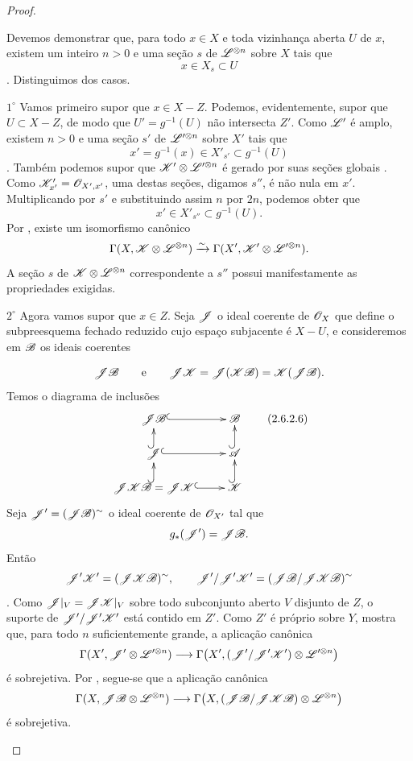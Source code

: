 \begin{proof}
\begin{env}[2.6.2.5]
Devemos demonstrar que, para todo $x\in X$ e toda vizinhança aberta $U$
de $x$, existem um inteiro $n>0$ e uma seção $s$ de
$\mathscr{L}^{\otimes n}$ sobre $X$ tais que
\[
  x\in X_s\subset U
\]
.
Distinguimos dos casos.

\smallskip
\noindent
$1^\circ$ Vamos primeiro supor que $x\in X-Z$.
Podemos, evidentemente, supor que $U\subset X-Z$, de modo que
$U'=g^{-1}(U)$ não intersecta $Z'$.
Como $\mathscr{L}'$ é amplo, existem $n>0$ e uma seção $s'$ de
$\mathscr{L}'^{\otimes n}$ sobre $X'$ tais que
\[
  x'=g^{-1}(x)\in X'_{s'}\subset g^{-1}(U)
\]
.
Também podemos supor que
$\mathscr{K}'\otimes\mathscr{L}'^{\otimes n}$ é gerado por suas seções globais
.
Como $\mathscr{K}'_{x'}=\mathscr{O}_{X',x'}$, uma destas seções, digamos $s''$, é
não nula em $x'$.
Multiplicando por $s'$ e substituindo assim $n$ por $2n$, podemos obter
que
\[
  x'\in X'_{s''}\subset g^{-1}(U).
\]
Por , existe um isomorfismo canônico
\[
  \Gamma(X,\mathscr{K}\otimes\mathscr{L}^{\otimes n})
  \xrightarrow{\sim}
  \Gamma(X',\mathscr{K}'\otimes\mathscr{L}'^{\otimes n}).
\]
A seção $s$ de $\mathscr{K}\otimes\mathscr{L}^{\otimes n}$ correspondente a
$s''$ possui manifestamente as propriedades exigidas.

\smallskip
\noindent
$2^\circ$ Agora vamos supor que $x\in Z$.
Seja $\mathscr{J}$ o ideal coerente de $\mathscr{O}_X$ que define o
subpreesquema fechado reduzido cujo espaço subjacente é $X-U$, e consideremos em
$\mathscr{B}$ os ideais coerentes


\[
  \mathscr{J}\mathscr{B}
  \qquad\text{e}\qquad
  \mathscr{J}\mathscr{K}
  =
  \mathscr{J}(\mathscr{K}\mathscr{B})
  =
  \mathscr{K}(\mathscr{J}\mathscr{B}).
\]
Temos o diagrama de inclusões
\[
  \xymatrix@R=1.5em{
    \sh{J}\sh{B}\ar@{^{(}->}[r] &
    \sh{B}\\
    \sh{J}\ar@{^{(}->}[r]\ar@{^{(}->}[u] &
    \sh{A}\ar@{^{(}->}[u]\\
    \sh{J}\sh{K}\sh{B}=\sh{J}\sh{K}
      \ar@{^{(}->}[r]\ar@{^{(}->}[u] &
    \sh{K}\ar@{^{(}->}[u]
  }
  \label{III.2.6.2.6}\tag{2.6.2.6}
\]
Seja $\mathscr{J}'=(\mathscr{J}\mathscr{B})^\sim$ o ideal coerente de
$\mathscr{O}_{X'}$ tal que
\[
  g_*(\mathscr{J}')=\mathscr{J}\mathscr{B}.
\]
Então
\[
  \mathscr{J}'\mathscr{K}'=(\mathscr{J}\mathscr{K}\mathscr{B})^\sim,
  \qquad
  \mathscr{J}'/\mathscr{J}'\mathscr{K}'
  =
  (\mathscr{J}\mathscr{B}/\mathscr{J}\mathscr{K}\mathscr{B})^\sim
\]
.
Como $\mathscr{J}|_V=\mathscr{J}\mathscr{K}|_V$ sobre todo subconjunto aberto $V$ disjunto
de $Z$, o suporte de $\mathscr{J}'/\mathscr{J}'\mathscr{K}'$ está contido em
$Z'$.
Como $Z'$ é próprio sobre $Y$,  mostra que, para todo
$n$ suficientemente grande, a aplicação canônica
\[
  \Gamma(X',\mathscr{J}'\otimes\mathscr{L}'^{\otimes n})
  \longrightarrow
  \Gamma\bigl(
    X',
    (\mathscr{J}'/\mathscr{J}'\mathscr{K}')\otimes\mathscr{L}'^{\otimes n}
  \bigr)
\]
é sobrejetiva.
Por , segue-se que a aplicação canônica
\[
  \Gamma(X,\mathscr{J}\mathscr{B}\otimes\mathscr{L}^{\otimes n})
  \longrightarrow
  \Gamma\bigl(
    X,
    (\mathscr{J}\mathscr{B}/\mathscr{J}\mathscr{K}\mathscr{B})
      \otimes\mathscr{L}^{\otimes n}
  \bigr)
\]
é sobrejetiva.


\end{env}
\end{proof}
